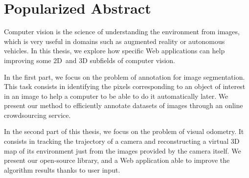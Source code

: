 \section*{Popularized Abstract}%
\label{sec:pop-abstract}

Computer vision is the science of understanding the environment from images,
which is very useful in domains such as augmented reality or autonomous vehicles.
In this thesis, we explore how specific Web applications can help improving
some 2D and 3D subfields of computer vision.

In the first part, we focus on the problem of annotation for image segmentation.
This task consists in identifying the pixels corresponding
to an object of interest in an image to help a computer to be able
to do it automatically later.
We present our method to efficiently annotate datasets of images
through an online crowdsourcing service.

In the second part of this thesis, we focus on the problem of visual odometry.
It consists in tracking the trajectory of a camera and reconstructing
a virtual 3D map of its environment just from the images provided by the camera itself.
We present our open-source library, and a Web application able
to improve the algorithm results thanks to user input.
